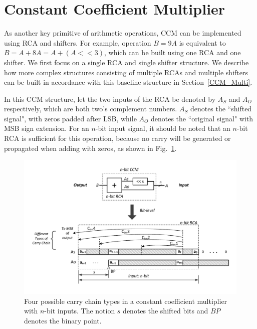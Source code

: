 \documentclass[prodmode,acmtrets]{acmsmall} %
\begin{document}
\section{Constant Coefficient Multiplier}\label{section_CCM}

As another key primitive of arithmetic operations, CCM can be implemented using RCA and shifters. For example, operation $B=9A$ is equivalent to $B=A+8A=A+(A<<3)$, which can be built using one RCA and one shifter. We first focus on a single RCA and single shifter structure. We describe how more complex structures consisting of multiple RCAs and multiple shifters can be built in accordance with this baseline structure in Section~\ref{CCM_Multi}.

In this CCM structure, let the two inputs of the RCA be denoted by $A_S$ and $A_O$ respectively, which are both two's complement numbers. $A_S$ denotes the ``shifted signal", with zeros padded after LSB, while $A_O$ denotes the ``original signal" with MSB sign extension. For an $n$-bit input signal, it should be noted that an $n$-bit RCA is sufficient for this operation, because no carry will be generated or propagated when adding with zeros, as shown in Fig.~\ref{CCM_fig}.

\begin{figure}[htbp]
  \vspace{-2ex}
  \centering
  \includegraphics[width=\textwidth]{./Figures/CCM_CarryChain.pdf}
  \vspace{-2ex}
  \caption{Four possible carry chain types in a constant coefficient multiplier with $n$-bit inputs. The notion $s$ denotes the shifted bits and $BP$ denotes the binary point.}
  \label{CCM_fig}
\end{figure}
\end{document}
